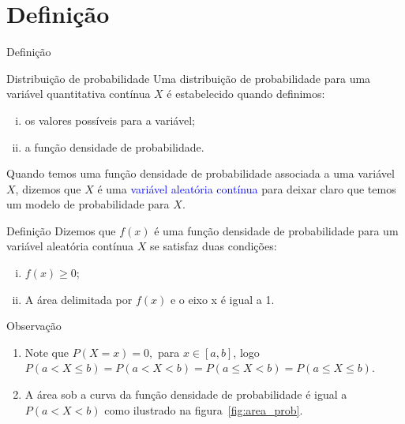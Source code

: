 \documentclass[9pt]{beamer}
\begin{document}
\section{Definição}
\begin{frame}{Definição}

{\scriptsize
\begin{block}{Distribuição de probabilidade}
	Uma distribuição de probabilidade para uma variável quantitativa contínua $X$ é estabelecido quando definimos:
	\begin{enumerate}[i.]
		\item os valores possíveis para a variável;
		\item a função densidade de probabilidade. 
	\end{enumerate}
	Quando temos uma função densidade de probabilidade associada a uma variável $X$, dizemos que $X$ é uma \textcolor{blue}{variável aleatória contínua} para deixar claro que temos um modelo de probabilidade para $X$.
\end{block}
\vfill

\begin{block}{Definição}
 Dizemos que $f(x)$ é uma função densidade de probabilidade para um variável aleatória contínua $X$ se satisfaz duas condições:
 \begin{enumerate}[i.]
  \item $f(x) \geq 0$;
  \item A área delimitada por $f(x)$ e o eixo x é igual a 1.
 \end{enumerate} 
\end{block}
\vfill

\begin{block}{Observação}
 \begin{enumerate}[1)]
  \item Note que $P(X=x)=0,$ para $x\in [a,b]$, logo $P(a < X \leq b) = P(a < X <b) = P(a \leq X <b) = P(a \leq X \leq b)$.
  \item A área sob a curva da função densidade de probabilidade é igual a $P(a < X < b)$ como ilustrado na figura~\ref{fig:area_prob}.
 \end{enumerate}
\end{block}
}
\end{frame}
\end{document}
